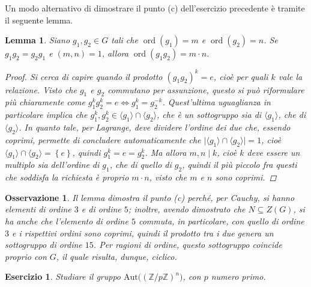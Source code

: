 \documentclass[11pt]{scrartcl}
\theoremstyle{style}
\newtheorem{lemma}{Lemma}[teorema]
\newtheorem{osservazione}{Osservazione}[section]
\newtheorem{esercizio}{Esercizio}[section]
\numberwithin{equation}{subsection}
\begin{document}
Un modo alternativo di dimostrare il punto (c) dell'esercizio precedente \`e tramite il seguente lemma.
\begin{lemma} 
	Siano $g_1,g_2 \in G$ tali che $\operatorname{ord}(g_1) = m $ e $ \operatorname{ord}(g_2) =n$.
	Se $g_1g_2=g_2g_1$ e $(m,n)=1$, allora $\operatorname{ord}(g_1g_2) = m \cdot n$.
	\begin{proof}
	Si cerca di capire quando il prodotto $(g_1g_2)^k = e$, cio\`e per quali $k$ vale la relazione.
	Visto che $g_1$ e $g_2$ commutano per assunzione, questo si pu\`o riformulare pi\`u chiaramente come $g_1^k g_2^k = e \iff g_1^k = g_2^{-k} $.
	Quest'ultima uguaglianza in particolare implica che $g_1^k, g_2^k \in \langle g_1 \rangle\cap \langle g_2 \rangle$, che \`e un sottogruppo sia di $\langle g_1 \rangle$, che di $\langle g_2 \rangle$.
	In quanto tale, per Lagrange, deve dividere l'ordine dei due che, essendo coprimi, permette di concludere automaticamente che $\lvert \langle g_1 \rangle\cap \langle g_2 \rangle \rvert =1$, cio\`e $\langle g_1 \rangle\cap \langle g_2 \rangle= \left\{ e \right\} $, quindi $g_1^k = e=g_2^k$.
	Ma allora $m,n  \mid k$, cio\`e $k$ deve essere un multiplo sia dell'ordine di $g_1$, che di quello di $g_2$, quindi il pi\`u piccolo fra questi che soddisfa la richiesta \`e proprio $m \cdot n$, visto che $m$ e $n$ sono coprimi.
	\end{proof}
\end{lemma}
\begin{osservazione}
Il lemma dimostra il punto (c) perch\'e, per Cauchy, si hanno elementi di ordine $3$ e di ordine $5$; inoltre, avendo dimostrato che $N \subseteq Z(G)$, si ha anche che l'elemento di ordine $5$ commuta, in particolare, con quello di ordine $3$ e i rispettivi ordini sono coprimi, quindi il prodotto tra i due genera un sottogruppo di ordine $15$. 
Per ragioni di ordine, questo sottogruppo coincide proprio con $G$, il quale risulta, dunque, ciclico.
\end{osservazione}
\begin{esercizio}
Studiare il gruppo $\mathrm{Aut} \big((\mathbb{Z}/ p\mathbb{Z})^n\big)$, con $p$ numero primo.
\end{esercizio}
\end{document}

